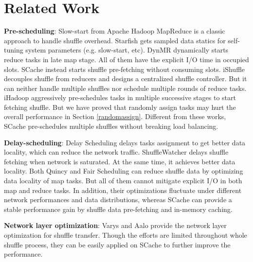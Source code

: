 \section{Related Work}
\textbf{Pre-scheduling}: Slow-start from Apache Hadoop MapReduce \cite{hadoop} is a classic approach to handle shuffle overhead. 
Starfish \cite{starfish} gets sampled data statics for self-tuning system parameters (e.g. slow-start, etc). 
DynMR \cite{dynmr} dynamically starts reduce tasks in late map stage. 
All of them have the explicit I/O time in occupied slots. 
SCache instead starts shuffle pre-fetching without consuming slots. 
iShuffle \cite{ishuffle} decouples shuffle from reducers and designs a centralized shuffle controller. 
But it can neither handle multiple shuffles nor schedule multiple rounds of reduce tasks. 
iHadoop \cite{ihadoop} aggressively pre-schedules tasks in multiple successive stages to start fetching shuffle. 
But we have proved that randomly assign tasks may hurt the overall performance in Section \ref{randomassign}. 
Different from these works, SCache pre-schedules multiple shuffles without breaking load balancing. 

\textbf{Delay-scheduling}: Delay Scheduling \cite{delay} delays tasks assignment to get better data locality, which can reduce the network traffic. 
ShuffleWatcher \cite{shufflewatcher} delays shuffle fetching when network is saturated. 
At the same time, it achieves better data locality. 
Both Quincy \cite{quincy} and Fair Scheduling \cite{preemptive} can reduce shuffle data by optimizing data locality of map tasks. 
But all of them cannot mitigate explicit I/O in both map and reduce tasks. 
In addition, their optimizations fluctuate under different network performances and data distributions, whereas SCache can provide a stable performance gain by shuffle data pre-fetching and in-memory caching.

\textbf{Network layer optimization}: Varys \cite{varys} and Aalo \cite{aalo} provide the network layer optimization for shuffle transfer. 
Though the efforts are limited throughout whole shuffle process, they can be easily applied on SCache to further improve the performance.